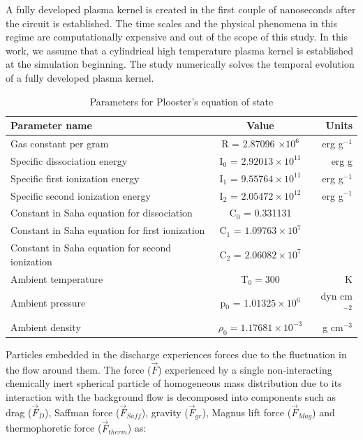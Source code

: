 \documentclass[12pt]{aiaa-tc}
\begin{document}
A fully developed plasma kernel is created in the first couple of nanoseconds after the circuit is established. The time scales and the physical phenomena in this regime are computationally expensive and out of the scope of this study. In this work, we assume that a cylindrical high temperature plasma kernel is established at the simulation beginning. The study numerically solves the temporal evolution of a fully developed plasma kernel.

\begin{table}[hbt!]
\caption{Parameters for Plooster's equation of state \cite{Plooster} \label{T1}}
\begin{center}
  \begin{tabular}{ l  c  r }
    \hline
    \hline
    Parameter name&Value&Units\\ \hline
    Gas constant per gram & R = 2.87096 $\times 10^6$ & erg g$^{-1}$ \\ 
    Specific dissociation energy & I$_0$ = $2.92013\times10^{11}$ & erg g \\ 
    Specific first ionization energy & I$_1$ = $9.55764\times10^{11}$ & erg g$^{-1}$ \\
    Specific second ionization energy & I$_2$ = $2.05472\times10^{12}$ & erg g$^{-1}$ \\
    Constant in Saha equation for dissociation &C$_0$ = 0.331131\\
    Constant in Saha equation for first ionization &C$_1$ = $1.09763\times10^{7}$\\
    Constant in Saha equation for second ionization &C$_2$ = $2.06082\times10^{7}$\\
    Ambient temperature & T$_0 = 300$& K\\
    Ambient pressure&p$_0$ = $1.01325\times10^{6}$&dyn cm$^{-2}$\\
    Ambient density& $\rho_0 = 1.17681\times10^{-3}$&g cm$^{-3}$\\
    \hline
  \end{tabular}
\end{center}
\end{table}

Particles embedded in the discharge experiences forces due to the fluctuation in the flow around them. The force ($\vec{F}$) experienced by a single non-interacting chemically inert spherical particle of homogeneous mass distribution due to its interaction with the background flow is decomposed into components such as drag ($\vec{F}_D$), Saffman force ($\vec{F}_{Saff}$), gravity ($\vec{F}_{gr}$), Magnus lift force ($\vec{F}_{Mag}$) and thermophoretic force ($\vec{F}_{therm}$) as: 
\end{document}
